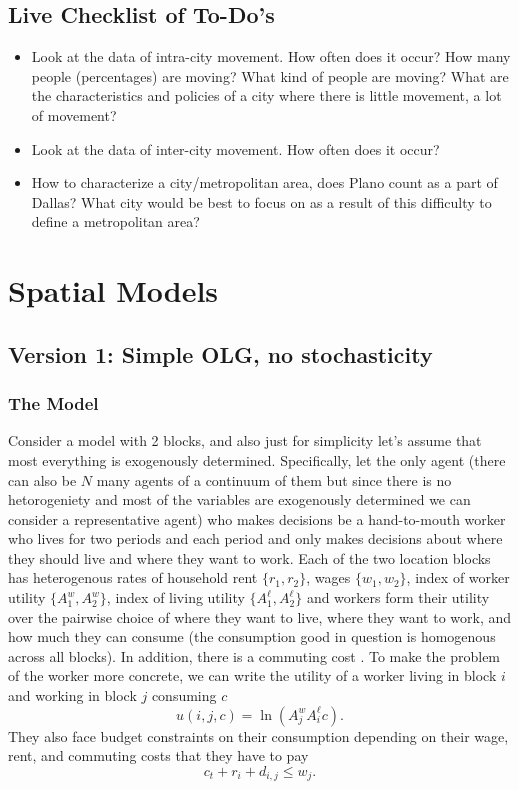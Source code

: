 \documentclass[11pt,english]{article}
\begin{document}
\subsection{Live Checklist of To-Do's}

\begin{itemize}
\item Look at the data of intra-city movement. How often does it occur? How many people (percentages) are moving? What kind of people are moving? What are the characteristics and policies of a city where there is little movement, a lot of movement?

\item Look at the data of inter-city movement. How often does it occur?

\item How to characterize a city/metropolitan area, does Plano count as a part of Dallas? What city would be best to focus on as a result of this difficulty to define a metropolitan area?

\end{itemize}


\section{Spatial Models}

\subsection{Version 1: Simple OLG, no stochasticity}

\subsubsection{The Model}

Consider a model with 2 blocks, and also just for simplicity let's assume that most everything is exogenously determined. Specifically, let the only agent (there can also be $N$ many agents of a continuum of them but since there is no hetorogeniety and most of the variables are exogenously determined we can consider a representative agent) who makes decisions be a hand-to-mouth worker who lives for two periods and each period and only makes decisions about where they should live and where they want to work. Each of the two location blocks has heterogenous rates of household rent $\{r_1, r_2\}$, wages $\{w_1, w_2\}$, index of worker utility $\{A^w_1, A^w_2\}$, index of living utility $\{A^\ell_1, A^\ell_2\}$ and workers form their utility over the pairwise choice of where they want to live, where they want to work, and how much they can consume (the consumption good in question is homogenous across all blocks). In addition, there is a commuting cost . To make the problem of the worker more concrete, we can write the utility of a worker living in block $i$ and working in block $j$ consuming $c$ $$u(i,j, c) = \ln \left(A^w_jA^\ell_i c\right).$$ They also face budget constraints on their consumption depending on their wage, rent, and commuting costs that they have to pay $$c_t + r_i  + d_{i,j}\leq w_j.$$
\end{document}
